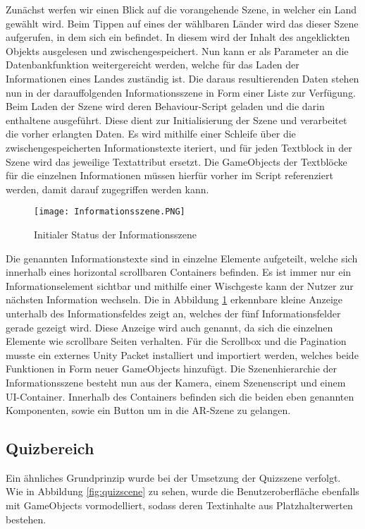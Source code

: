 Zunächst werfen wir einen Blick auf die vorangehende Szene, in welcher ein Land gewählt wird. 
Beim Tippen auf eines der wählbaren Länder wird das  dieser Szene aufgerufen, in dem sich ein  befindet. 
In diesem wird der Inhalt des angeklickten Objekts ausgelesen und zwischengespeichert. Nun kann er als Parameter an die Datenbankfunktion weitergereicht werden, welche für das Laden der Informationen eines Landes zuständig ist. 
Die daraus resultierenden Daten stehen nun in der darauffolgenden Informationsszene in Form einer Liste zur Verfügung.
Beim Laden der Szene wird deren Behaviour-Script geladen und die darin enthaltene  ausgeführt. Diese dient zur Initialisierung der Szene und verarbeitet die vorher erlangten Daten.
Es wird mithilfe einer Schleife über die zwischengespeicherten Informationstexte iteriert, und für jeden Textblock in der Szene wird das jeweilige Textattribut ersetzt.
Die GameObjects der Textblöcke für die einzelnen Informationen müssen hierfür vorher im Script referenziert werden, damit darauf zugegriffen werden kann.

\begin{figure} [h]
\centering
\texttt{[image: Informationsszene.PNG]}
\caption{Initialer Status der Informationsszene}
\label{fig:infoscene}
\end{figure}
Die genannten Informationstexte sind in einzelne Elemente aufgeteilt, welche sich innerhalb eines horizontal scrollbaren Containers befinden. 
Es ist immer nur ein Informationselement sichtbar und mithilfe einer Wischgeste kann der Nutzer zur nächsten Information wechseln.
Die in Abbildung \ref{fig:infoscene} erkennbare kleine Anzeige unterhalb des Informationsfeldes zeigt an, welches der fünf Informationsfelder gerade gezeigt wird.
Diese Anzeige wird auch  genannt, da sich die einzelnen Elemente wie scrollbare Seiten verhalten.
Für die Scrollbox und die Pagination musste ein externes Unity Packet installiert und importiert werden, welches beide Funktionen in Form neuer GameObjects hinzufügt.
Die Szenenhierarchie der Informationsszene besteht nun aus der Kamera, einem Szenenscript und einem UI-Container. 
Innerhalb des Containers befinden sich die beiden eben genannten Komponenten, sowie ein Button um in die AR-Szene zu gelangen.

\subsection{Quizbereich}
Ein ähnliches Grundprinzip wurde bei der Umsetzung der Quizszene verfolgt.
Wie in Abbildung \ref{fig:quizscene} zu sehen, wurde die Benutzeroberfläche ebenfalls mit GameObjects vormodelliert, sodass deren Textinhalte aus Platzhalterwerten bestehen.

